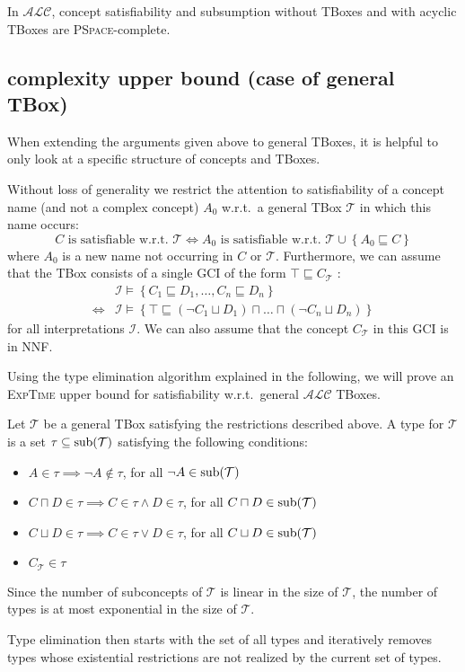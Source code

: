 \begin{theorem}
	In $\mathcal{ALC}$, concept satisfiability and subsumption
	without TBoxes and with acyclic TBoxes are \textsc{PSpace}-complete.
\end{theorem}

\subsection{complexity upper bound (case of general TBox)}
When extending the arguments given above to general TBoxes,
it is helpful to only look at a specific structure of concepts and TBoxes.

Without loss of generality we restrict the attention to satisfiability of a concept name
(and not a complex concept) $A_0$ w.r.t.\ a general TBox $\mathcal{T}$ in which this name occurs:
\[
C \text{ is satisfiable w.r.t.\ } \mathcal{T} \iff A_0 \text{ is satisfiable w.r.t.\ }\mathcal{T} \cup \left\{ A_0 \sqsubseteq C \right\}
\]
where $A_0$ is a new name not occurring in $C$ or $\mathcal{T}$.
Furthermore, we can assume that the TBox consists of a single GCI of the form $\top \sqsubseteq C_{\mathcal{T}}$ :
\[
	\begin{split}
		&\mathcal{I} \vDash \left\{ C_1 \sqsubseteq D_1, \ldots, C_n \sqsubseteq D_n \right\} \\ \iff &\mathcal{I} \vDash \left\{ \top \sqsubseteq (\neg C_1 \sqcup D_1) \sqcap \ldots \sqcap (\neg C_n \sqcup D_n) \right\}
	\end{split}
\]
for all interpretations $\mathcal{I}$.
We can also assume that the concept $C_{\mathcal{T}}$ in this GCI is in NNF.

Using the type elimination algorithm explained in the following,
we will prove an \textsc{ExpTime} upper bound for satisfiability w.r.t.\ general $\mathcal{ALC}$ TBoxes.

\begin{definition}[type]
	Let $\mathcal{T}$ be a general TBox satisfying the restrictions described above.
	A type for $\mathcal{T}$ is a set $\tau \subseteq \operatorname{\text{sub}}(\mathcal{T})$ satisfying the following conditions:
	\begin{itemize}
		\item $A \in \tau \implies \neg A \notin \tau$, for all $\neg A \in \operatorname{\text{sub}}(\mathcal{T})$
		\item $C \sqcap D \in \tau \implies C \in \tau \land D \in \tau$, for all $C \sqcap D \in \func{sub}(\mathcal{T})$
		\item $C \sqcup D \in \tau \implies C \in \tau \lor D \in \tau$, for all $C \sqcup D \in \func{sub}(\mathcal{T})$
		\item $C_{\mathcal{T}} \in \tau$
	\end{itemize}
\end{definition}
\begin{note}
	Since the number of subconcepts of $\mathcal{T}$ is linear in the size of $\mathcal{T}$,
	the number of types is at most exponential in the size of $\mathcal{T}$.
\end{note}

Type elimination then starts with the set of all types and iteratively removes types
whose existential restrictions are not realized by the current set of types.
